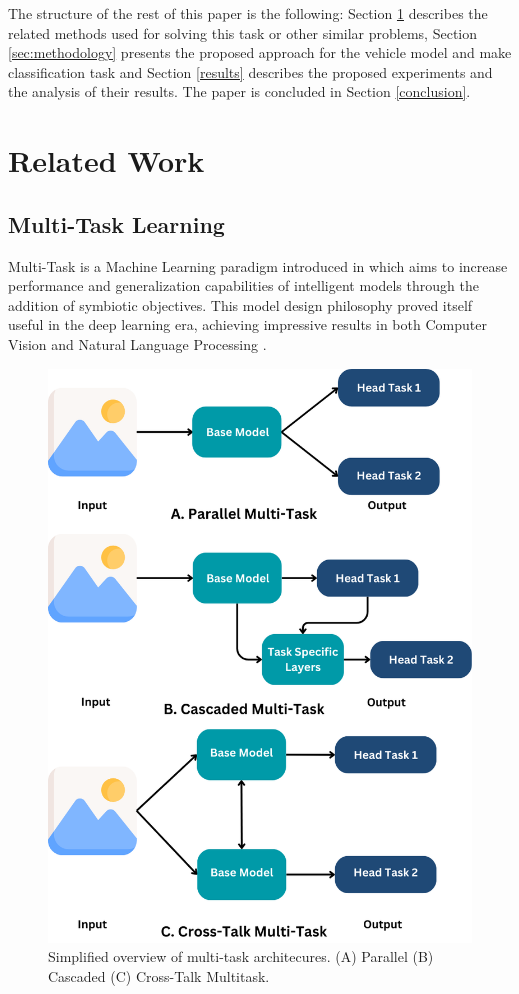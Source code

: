 \documentclass[conference]{IEEEtran}
\begin{document}
The structure of the rest of this paper is the following: Section \ref{relWork} describes the related methods used for solving this task or other similar problems, Section \ref{sec:methodology} presents the proposed approach for the vehicle model and make classification task and Section \ref{results} describes the proposed experiments and the analysis of their results. The paper is concluded in Section \ref{conclusion}.

\section{Related Work}
\label{relWork}

\subsection{Multi-Task Learning}

Multi-Task is a Machine Learning paradigm introduced in \cite{caruana1997multitask} which aims to increase performance and generalization capabilities of intelligent models through the addition of symbiotic objectives. This model design philosophy proved itself useful in the deep learning era, achieving impressive results in both Computer Vision and Natural Language Processing \cite{zhang2021survey}. 

\begin{figure}[hbt!]
\centering
\centerline{\includegraphics[scale=0.3]{figures/multi-task-taxonomy.png}}
	\caption{Simplified overview of multi-task architecures. (A) Parallel (B) Cascaded (C) Cross-Talk Multitask.}
	\label{fig:multi-task-taxonomy}
\end{figure}
\end{document}
